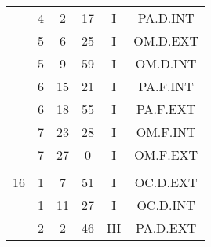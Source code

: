 \documentclass[12pt, a4paper]{article}
\begin{document}
\begin{multicols}{3}
{\begin{tabular}{c c c c c c}
	 	 	 	 & 4 & 2 & 17 & I & PA.D.INT\\%
	 	 	 	 & 5 & 6 & 25 & I & OM.D.EXT\\%
	 	 	 	 & 5 & 9 & 59 & I & OM.D.INT\\%
	 	 	 	 & 6 & 15 & 21 & I & PA.F.INT\\%
	 	 	 	 & 6 & 18 & 55 & I & PA.F.EXT\\%
	 	 	 	 & 7 & 23 & 28 & I & OM.F.INT\\%
	 	 	 	 & 7 & 27 & 0 & I & OM.F.EXT\\%
	 	 	 	 & & & & & \\%
	 	 	 	16 & 1 & 7 & 51 & I & OC.D.EXT\\%
	 	 	 	 & 1 & 11 & 27 & I & OC.D.INT\\%
	 	 	 	 & 2 & 2 & 46 & III & PA.D.EXT\\%
	 	 \end{tabular}
 	}
\end{multicols}
\end{document}
